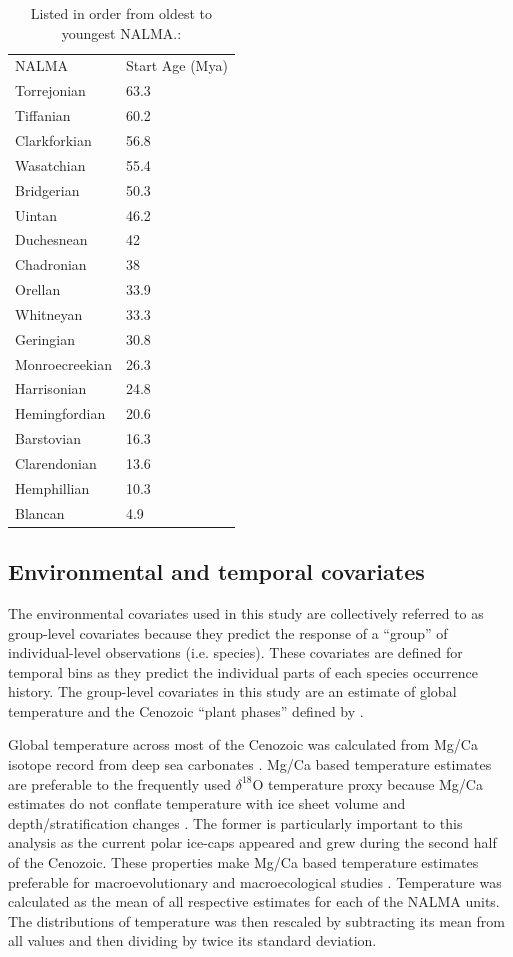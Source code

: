 \documentclass[12pt,letterpaper]{article}
\begin{document}
\begin{table}[ht]
  \centering
  \caption{Listed in order from oldest to youngest NALMA.:}
  \begin{tabular} { l l }
    \hline
    NALMA & Start Age (Mya) \\
    Torrejonian & 63.3 \\
    Tiffanian & 60.2 \\
    Clarkforkian & 56.8 \\
    Wasatchian & 55.4 \\
    Bridgerian & 50.3 \\
    Uintan & 46.2 \\
    Duchesnean & 42 \\
    Chadronian & 38 \\
    Orellan & 33.9 \\
    Whitneyan & 33.3 \\
    Geringian & 30.8 \\
    Monroecreekian & 26.3 \\
    Harrisonian & 24.8 \\
    Hemingfordian & 20.6 \\
    Barstovian & 16.3 \\
    Clarendonian & 13.6 \\
    Hemphillian & 10.3 \\
    Blancan & 4.9 \\
    \hline
  \end{tabular}
  \label{tab:nalma}
\end{table}


\subsection*{Environmental and temporal covariates}
The environmental covariates used in this study are collectively referred to as group-level covariates because they predict the response of a ``group'' of individual-level observations (i.e. species). These covariates are defined for temporal bins as they predict the individual parts of each species occurrence history. The group-level covariates in this study are an estimate of global temperature and the Cenozoic ``plant phases'' defined by \citet{Graham2011a}. 

Global temperature across most of the Cenozoic was calculated from Mg/Ca isotope record from deep sea carbonates \citep{Cramer2011}. Mg/Ca based temperature estimates are preferable to the frequently used \(\delta^{18}\)O temperature proxy \citep{Zachos2001,Zachos2008,Alroy2000g,Figueirido2012} because Mg/Ca estimates do not conflate temperature with ice sheet volume and depth/stratification changes \citep{Cramer2011,Ezard2016a}. The former is particularly important to this analysis as the current polar ice-caps appeared and grew during the second half of the Cenozoic. These properties make Mg/Ca based temperature estimates preferable for macroevolutionary and macroecological studies \citep{Ezard2016a}. Temperature was calculated as the mean of all respective estimates for each of the NALMA units. The distributions of temperature was then rescaled by subtracting its mean from all values and then dividing by twice its standard deviation.
\end{document}

